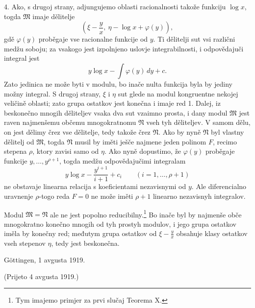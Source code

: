 \documentclass[11pt]{article}
\begin{document}
4. Ako, s drugoj strany, adjungujemo oblasti racionalnosti takože funkciju \(\log x\), togda \(\mathfrak M\) imaje dělitelje
\[
 \left(\xi-\frac{y}{x},\ \eta-\log x+\varphi(y)\right),
\]
gdě \(\varphi(y)\) proběgaje vse racionalne funkcije od \(y\). Ti dělitelji sut vsi različni medžu soboju; za vsakogo jest izpolnjeno uslovje integrabilnosti, i odpovědajuči integral jest
\[
 y\log x-\int\varphi(y)\,dy+c.
\]
Zato jedinica ne može byti v modulu, bo inače nulta funkcija byla by jediny možny integral. S drugoj strany, \(\xi\) i \(\eta\) sut glede na modul kongruentne nekojej veličině oblasti; zato grupa ostatkov jest konečna i imaje red 1. Dalej, iz beskonečno mnogih děliteljev vsaka dva sut vzaimno prosta, i dany modul \(\mathfrak M\) jest raven najmenšemu občemu mnogokratnomu \(\mathfrak N\) vseh tyh děliteljev. V samom dělu, on jest dělimy črez vse dělitelje, tedy takože črez \(\mathfrak N\). Ako by nyně \(\mathfrak N\) byl vlastny dělitelj od \(\mathfrak M\), togda \(\mathfrak N\) musil by iměti ješče najmene jeden polinom \(F\), recimo stepena \(\rho\), ktory zavisi samo od \(\eta\). Ako nyně dopustimo, že \(\varphi(y)\) proběgaje funkcije \(y,
\ldots,y^{\rho+1}\), togda medžu odpovědajučimi integralam
\[
 y\log x-\frac{y^{i+1}}{i+1}+c_i\qquad(i=1,
\ldots,
\rho+1)
\]
ne obstavaje linearna relacija s koeficientami nezavisnymi od \(y\). Ale diferencialno uravnenje \(\rho\)-togo reda \(F=0\) ne može iměti \(\rho+1\) linearno nezavisnyh integralov.

Modul \(\mathfrak M=\mathfrak N\) ale ne jest popolno reducibilny.\footnote{Tym imajemo primjer za prvi slučaj Teorema X.} Bo inače byl by najmenše obče mnogokratno konečno mnogih od tyh prostyh modulov, i jego grupa ostatkov iměla by konečny red; međutym grupa ostatkov od \(\xi-\frac{y}{x}\) obsahuje klasy ostatkov vseh stepenov \(\eta\), tedy jest beskonečna.

Göttingen, 1 avgusta 1919.

\begin{center}
(Prijeto 4 avgusta 1919.)
\end{center}
\end{document}
